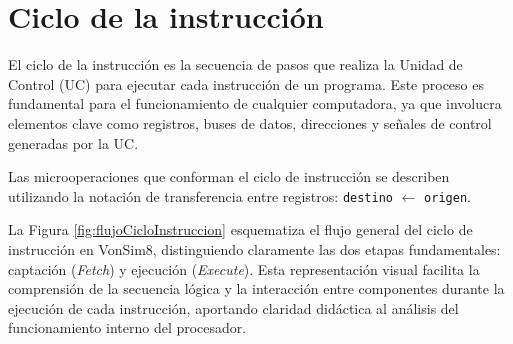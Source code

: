 \documentclass[12pt,oneside]{templates/unerthesis}
\begin{document}
\begin{table}[!h]
\centering
\caption{\label{tab:tablaregistros}Tabla de registros de propósito general}
\centering
{}
\end{table}

\hypertarget{ciclo-de-la-instrucciuxf3n}{%
\section{Ciclo de la instrucción}\label{ciclo-de-la-instrucciuxf3n}}

El ciclo de la instrucción es la secuencia de pasos que realiza la Unidad de Control (UC) para ejecutar cada instrucción de un programa. Este proceso es fundamental para el funcionamiento de cualquier computadora, ya que involucra elementos clave como registros, buses de datos, direcciones y señales de control generadas por la UC.

Las microoperaciones que conforman el ciclo de instrucción se describen utilizando la notación de transferencia entre registros: \texttt{destino} \(\leftarrow\) \texttt{origen}.

La Figura \ref{fig:flujoCicloInstruccion} esquematiza el flujo general del ciclo de instrucción en VonSim8, distinguiendo claramente las dos etapas fundamentales: captación (\emph{Fetch}) y ejecución (\emph{Execute}). Esta representación visual facilita la comprensión de la secuencia lógica y la interacción entre componentes durante la ejecución de cada instrucción, aportando claridad didáctica al análisis del funcionamiento interno del procesador.
\end{document}
